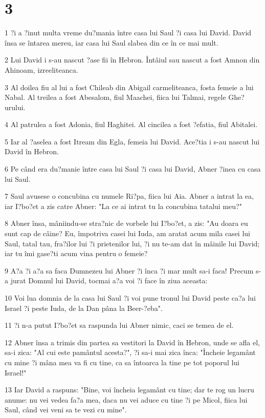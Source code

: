 \chapter{3}

\par 1 ?i a ?inut multa vreme du?mania între casa lui Saul ?i casa lui David. David însa se întarea mereu, iar casa lui Saul slabea din ce în ce mai mult.
\par 2 Lui David i s-au nascut ?ase fii în Hebron. Întâiul sau nascut a fost Amnon din Ahinoam, izreeliteanca.
\par 3 Al doilea fiu al lui a fost Chileab din Abigail carmeliteanca, fosta femeie a lui Nabal. Al treilea a fost Abesalom, fiul Maachei, fiica lui Talmai, regele Ghe?urului.
\par 4 Al patrulea a fost Adonia, fiul Haghitei. Al cincilea a fost ?efatia, fiul Abitalei.
\par 5 Iar al ?aselea a fost Itream din Egla, femeia lui David. Ace?tia i s-au nascut lui David în Hebron.
\par 6 Pe când era du?manie între casa lui Saul ?i casa lui David, Abner ?inea cu casa lui Saul.
\par 7 Saul avusese o concubina cu numele Ri?pa, fiica lui Aia. Abner a intrat la ea, iar I?bo?et a zis catre Abner: "La ce ai intrat tu la concubina tatalui meu?"
\par 8 Abner însa, mâniindu-se stra?nic de vorbele lui I?bo?et, a zis: "Au doara eu sunt cap de câine? Eu, împotriva casei lui Iuda, am aratat acum mila casei lui Saul, tatal tau, fra?ilor lui ?i prietenilor lui, ?i nu te-am dat în mâinile lui David; iar tu îmi gase?ti acum vina pentru o femeie?
\par 9 A?a ?i a?a sa faca Dumnezeu lui Abner ?i înca ?i mar mult sa-i faca! Precum s-a jurat Domnul lui David, tocmai a?a voi ?i face în ziua aceasta:
\par 10 Voi lua domnia de la casa lui Saul ?i voi pune tronul lui David peste ca?a lui Israel ?i peste Iuda, de la Dan pâna la Beer-?eba".
\par 11 ?i n-a putut I?bo?et sa raspunda lui Abner nimic, caci se temea de el.
\par 12 Abner însa a trimis din partea sa vestitori la David în Hebron, unde se afla el, sa-i zica: "Al cui este pamântul acesta?", ?i sa-i mai zica înca: "Încheie legamânt cu mine ?i mâna mea va fi cu tine, ca sa întoarca la tine pe tot poporul lui Israel!"
\par 13 Iar David a raspuns: "Bine, voi încheia legamânt cu tine; dar te rog un lucru anume: nu vei vedea fa?a mea, daca nu vei aduce cu tine ?i pe Micol, fiica lui Saul, când vei veni sa te vezi cu mine".
